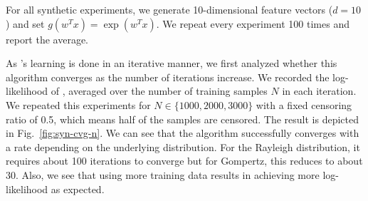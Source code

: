 For all synthetic experiments, we generate 10-dimensional feature vectors ($d=10$) and set $g(w^Tx)=\exp(w^Tx)$.
We repeat every experiment 100 times and report the average.


As \npglm's learning is done in an iterative manner, we first analyzed whether this algorithm converges as the number of iterations increase. We recorded the log-likelihood of \npglm, averaged over the number of training samples $N$ in each iteration. We repeated this experiments for $N\in\{1000,2000,3000\}$ with a fixed censoring ratio of 0.5, which means half of the samples are censored. The result is depicted in Fig.~\ref{fig:syn-cvg-n}. We can see that the algorithm successfully converges with a rate depending on the underlying distribution. For the Rayleigh distribution, it requires about 100 iterations to converge but for Gompertz, this reduces to about 30. Also, we see that using more training data results in achieving more log-likelihood as expected.

